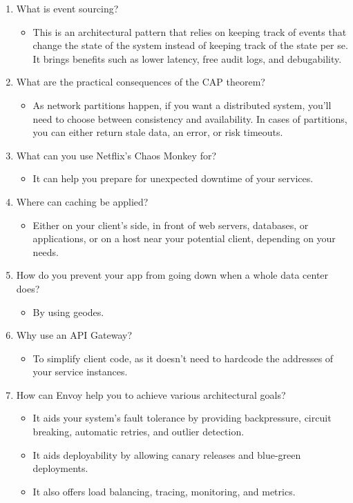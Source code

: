 \begin{enumerate}
\item
What is event sourcing?
\begin{itemize}
\item 
This is an architectural pattern that relies on keeping track of events that change the state of the system instead of keeping track of the state per se. It brings benefits such as lower latency, free audit logs, and debugability.
\end{itemize}

\item 
What are the practical consequences of the CAP theorem?
\begin{itemize}
\item 
As network partitions happen, if you want a distributed system, you'll need to choose between consistency and availability. In cases of partitions, you can either return stale data, an error, or risk timeouts.
\end{itemize}

\item 
What can you use Netflix's Chaos Monkey for?
\begin{itemize}
\item 
It can help you prepare for unexpected downtime of your services.
\end{itemize}

\item 
Where can caching be applied?
\begin{itemize}
\item 
Either on your client's side, in front of web servers, databases, or applications, or on a host near your potential client, depending on your needs.
\end{itemize}

\item 
How do you prevent your app from going down when a whole data center does?

\begin{itemize}
\item 
By using geodes.
\end{itemize}

\item 
Why use an API Gateway?
\begin{itemize}
\item 
To simplify client code, as it doesn't need to hardcode the addresses of your service instances.
\end{itemize}

\item How can Envoy help you to achieve various architectural goals?	
\begin{itemize}
\item 
It aids your system's fault tolerance by providing backpressure, circuit breaking, automatic retries, and outlier detection.

\item 
It aids deployability by allowing canary releases and blue-green deployments.

\item 
It also offers load balancing, tracing, monitoring, and metrics.
\end{itemize}
\end{enumerate}